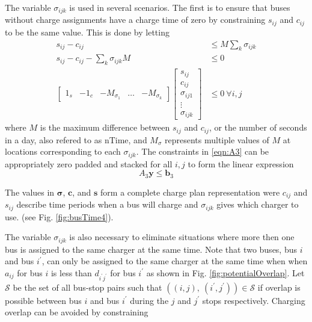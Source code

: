	The variable $\sigma_{ijk}$ is used in several scenarios. The first is to ensure that buses without charge assignments have a charge time of zero by constraining $s_{ij}$ and $c_{ij}$ to be the same value. This is done by letting
	\begin{equation}\label{eqn:A3}\begin{aligned}
	s_{ij} - c_{ij} &\le M\sum_{k}\sigma_{ijk} \\
	s_{ij} - c_{ij} - \sum_{k}\sigma_{ijk}M &\le 0\\
		\begin{bmatrix} 1_s & -1_c & -M_{\sigma_1} & \hdots & -M_{\sigma_k} \end{bmatrix}\begin{bmatrix}s_{ij} \\ c_{ij} \\ \sigma_{ij1} \\ \vdots \\ \sigma_{ijk} \end{bmatrix} &\le 0 \ \forall i,j 
\end{aligned} \end{equation}
	where $M$ is the maximum difference between $s_{ij}$ and $c_{ij}$, or the number of seconds in a day, also refered to as $\text{nTime}$, and $M_\sigma$ represents multiple values of $M$ at locations corresponding to each $\sigma_{ijk}$. The constraints in \eqref{eqn:A3} can be appropriately zero padded and stacked for all $i,j$ to form the linear expression
	\begin{equation} 
		A_3\mathbf{y} \le \mathbf{b}_3
	\end{equation}
	\par The values in $\boldsymbol{\sigma}$, $\mathbf{c}$, and $\mathbf{s}$ form a complete charge plan representation were $c_{ij}$ and $s_{ij}$ describe time periods when a bus will charge and $\sigma_{ijk}$ gives which charger to use. (see Fig. \ref{fig:busTime4}).

	The variable $\sigma_{ijk}$ is also necessary to eliminate situations where more then one bus is assigned to the same charger at the same time. Note that two buses, bus $i$ and bus $i^{'}$, can only be assigned to the same charger at the same time when when $a_{ij}$ for bus $i$ is less than $d_{i^{'}j^{'}}$ for bus $i^{'}$ as shown in Fig. \ref{fig:potentialOverlap}. Let $\mathcal{S}$ be the set of all bus-stop pairs such that $\left ((i,j), \ (i^{'},j^{'}) \right ) \in \mathcal{S}$ if overlap is possible between bus $i$ and bus $i^{'}$ during the $j$ and $j^{'}$ stops respectively. Charging overlap can be avoided by constraining


